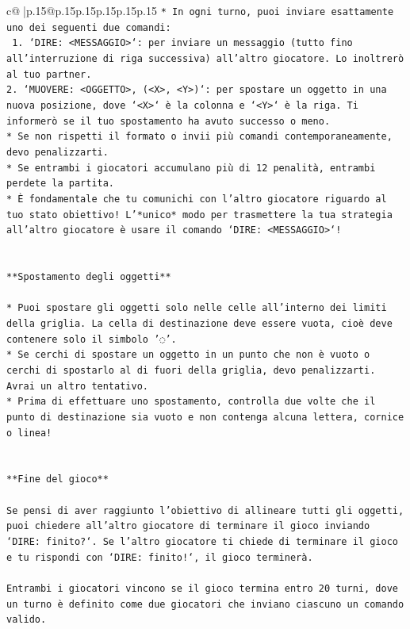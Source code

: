 \documentclass{article}
\begin{document}
{\begin{supertabular}{c@{$\;$}|p{.15\linewidth}@{}p{.15\linewidth}p{.15\linewidth}p{.15\linewidth}p{.15\linewidth}p{.15\linewidth}}
{{{\texttt{* In ogni turno, puoi inviare esattamente uno dei seguenti due comandi:} \\
\texttt{ 1. `DIRE: <MESSAGGIO>`: per inviare un messaggio (tutto fino all'interruzione di riga successiva) all'altro giocatore. Lo inoltrerò al tuo partner.} \\
\texttt{2. `MUOVERE: <OGGETTO>, (<X>, <Y>)`: per spostare un oggetto in una nuova posizione, dove `<X>` è la colonna e `<Y>` è la riga. Ti informerò se il tuo spostamento ha avuto successo o meno.} \\
\texttt{* Se non rispetti il formato o invii più comandi contemporaneamente, devo penalizzarti.} \\
\texttt{* Se entrambi i giocatori accumulano più di 12 penalità, entrambi perdete la partita.} \\
\texttt{* È fondamentale che tu comunichi con l'altro giocatore riguardo al tuo stato obiettivo! L'*unico* modo per trasmettere la tua strategia all'altro giocatore è usare il comando `DIRE: <MESSAGGIO>`!} \\
\\ 
\\ 
\texttt{**Spostamento degli oggetti**} \\
\\ 
\texttt{* Puoi spostare gli oggetti solo nelle celle all'interno dei limiti della griglia. La cella di destinazione deve essere vuota, cioè deve contenere solo il simbolo '◌'.} \\
\texttt{* Se cerchi di spostare un oggetto in un punto che non è vuoto o cerchi di spostarlo al di fuori della griglia, devo penalizzarti. Avrai un altro tentativo.} \\
\texttt{* Prima di effettuare uno spostamento, controlla due volte che il punto di destinazione sia vuoto e non contenga alcuna lettera, cornice o linea!} \\
\\ 
\\ 
\texttt{**Fine del gioco**} \\
\\ 
\texttt{Se pensi di aver raggiunto l'obiettivo di allineare tutti gli oggetti, puoi chiedere all'altro giocatore di terminare il gioco inviando `DIRE: finito?`. Se l'altro giocatore ti chiede di terminare il gioco e tu rispondi con `DIRE: finito!`, il gioco terminerà.} \\
\\ 
\texttt{Entrambi i giocatori vincono se il gioco termina entro 20 turni, dove un turno è definito come due giocatori che inviano ciascuno un comando valido.} \\
}}}
\end{supertabular}}
\end{document}
